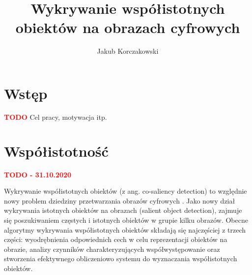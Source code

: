 \documentclass[a4paper,12pt,twoside,openany]{report}
\title{Wykrywanie współistotnych obiektów na obrazach cyfrowych}
\author{Jakub Korczakowski}
\begin{document}
\maketitle

\chapter{Wstęp}
\textcolor{red}{\textbf{TODO}}
Cel pracy, motywacja itp.




	


\chapter{Współistotność}
\textcolor{red}{\textbf{TODO - 31.10.2020}}

Wykrywanie współistotnych obiektów (z ang. co-saliency detection) to względnie nowy problem dziedziny przetwarzania obrazów cyfrowych \cite{10.1145/3158674}. Jako nowy dział wykrywania istotnych obiektów na obrazach (salient object detection), zajmuje się poszukiwaniem częstych i istotnych obiektów w grupie kilku obrazów. Obecne algorytmy wykrywania współistotnych obiektów składają się najczęściej z trzech części: wyodrębnienia odpowiednich cech w celu reprezentacji obiektów na obrazie, analizy czynników  charakteryzujących współwystępowanie oraz stworzenia efektywnego obliczeniowo systemu do wyznaczania współistotnych obiektów. 
	 
\end{document}
